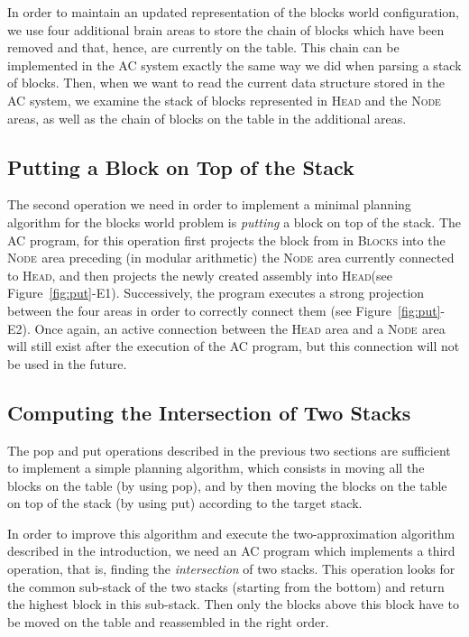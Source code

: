 \documentclass[letterpaper]{article}
\newcommand{\workzone}[1]{\mbox{\textsc{Node}$_{#1}$}\xspace}
\newcommand{\blocks}{\textsc{Blocks}\xspace}
\newcommand{\headzone}{\textsc{Head}\xspace}
\begin{document}
In order to maintain an updated representation of the blocks world configuration, we use four additional brain areas to store the chain of blocks which have been removed and that, hence, are currently on the table. This chain can be implemented in the AC system exactly the same way we did when parsing a stack of blocks. Then, when we want to read the current data structure stored in the AC system, we examine the stack of blocks represented in \headzone and the \workzone{} areas, as well as the chain of blocks on the table in the additional areas.
 \subsection{Putting a Block on Top of the Stack}

The second operation we need in order to implement a minimal planning algorithm for the blocks world problem is {\em putting} a block on top of the stack. The AC program, for this operation first projects the block from in \blocks into the \workzone{} area preceding (in modular arithmetic) the \workzone{} area currently connected to  \headzone, and then projects the newly created assembly into \headzone (see Figure~\ref{fig:put}-E1). Successively, the program executes a strong projection between the four areas in order to correctly connect them (see Figure~\ref{fig:put}-E2). Once again, an active connection between the \headzone area and a \workzone{} area will still exist after the execution of the AC program, but this connection will not be used in the future. 

 \subsection{Computing the Intersection of Two Stacks}

The pop and put operations described in the previous two sections are sufficient to implement a simple planning algorithm, which consists in moving all the blocks on the table (by using pop), and by then moving the blocks on the table on top of the stack (by using put) according to the target stack.

In order to improve this algorithm and execute the two-approximation algorithm described in the introduction, we need an AC program which implements a third operation, that is, finding the {\em intersection} of two stacks. This operation looks for the common sub-stack of the two stacks (starting from the bottom) and return the highest block in this sub-stack. Then only the blocks above this block have to be moved on the table and reassembled in the right order.  
\end{document}

